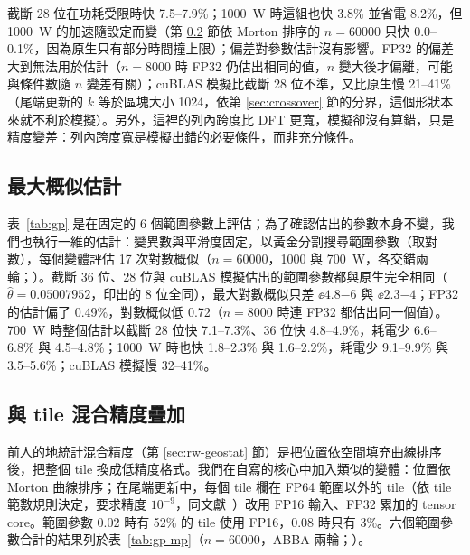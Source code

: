 截斷 28 位在功耗受限時快 7.5–7.9\%；1000~W 時這組也快 3.8\% 並省電 8.2\%，但 1000~W 的加速隨設定而變（第 \ref{sec:gp-mp} 節依 Morton 排序的 $n = 60000$ 只快 0.0–0.1\%，因為原生只有部分時間撞上限）；偏差對參數估計沒有影響。FP32 的偏差大到無法用於估計（$n = 8000$ 時 FP32 仍估出相同的值，$n$ 變大後才偏離，可能與條件數隨 $n$ 變差有關）；cuBLAS 模擬比截斷 28 位不準，又比原生慢 21–41\%（尾端更新的 $k$ 等於區塊大小 1024，依第 \ref{sec:crossover} 節的分界，這個形狀本來就不利於模擬）。另外，這裡的列內跨度比 DFT 更寬，模擬卻沒有算錯，只是精度變差：列內跨度寬是模擬出錯的必要條件，而非充分條件。

\subsection{最大概似估計}\label{sec:gp-mle}

表~\ref{tab:gp} 是在固定的 6 個範圍參數上評估；為了確認估出的參數本身不變，我們也執行一維的估計：變異數與平滑度固定，以黃金分割搜尋範圍參數（取對數），每個變體評估 17 次對數概似（$n = 60000$，1000 與 700~W，各交錯兩輪；）。截斷 36 位、28 位與 cuBLAS 模擬估出的範圍參數都與原生完全相同（$\hat\theta = 0.05007952$，印出的 8 位全同），最大對數概似只差 $\ee{4.8}{-6}$ 與 $\ee{2.3}{-4}$；FP32 的估計偏了 0.49\%，對數概似低 0.72（$n = 8000$ 時連 FP32 都估出同一個值）。700~W 時整個估計以截斷 28 位快 7.1–7.3\%、36 位快 4.8–4.9\%，耗電少 6.6–6.8\% 與 4.5–4.8\%；1000~W 時也快 1.8–2.3\% 與 1.6–2.2\%，耗電少 9.1–9.9\% 與 3.5–5.6\%；cuBLAS 模擬慢 32–41\%。

\subsection{與 tile 混合精度疊加}\label{sec:gp-mp}

前人的地統計混合精度（第 \ref{sec:rw-geostat} 節）是把位置依空間填充曲線排序後，把整個 tile 換成低精度格式。我們在自寫的核心中加入類似的變體：位置依 Morton 曲線排序；在尾端更新中，每個 tile 欄在 FP64 範圍以外的 tile（依 tile 範數規則決定，要求精度 $10^{-9}$，同文獻~\cite{Cao2023}）改用 FP16 輸入、FP32 累加的 tensor core。範圍參數 0.02 時有 52\% 的 tile 使用 FP16，0.08 時只有 3\%。六個範圍參數合計的結果列於表~\ref{tab:gp-mp}（$n = 60000$，ABBA 兩輪；）。

